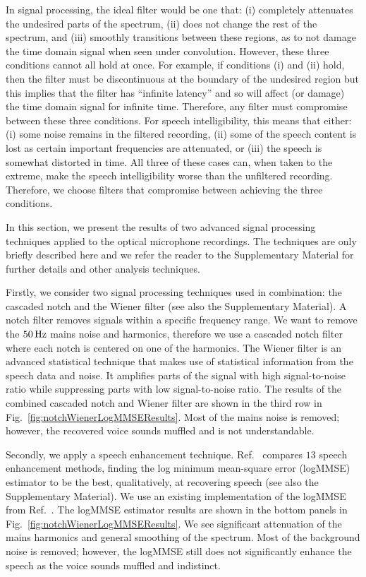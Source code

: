 \documentclass[paper-main.tex]{subfiles}
\begin{document}
In signal processing, the ideal filter would be one that:
(i) completely attenuates the undesired parts of the spectrum, 
(ii) does not change the rest of the spectrum, and 
(iii) smoothly transitions between these regions, as to not damage the time domain signal when seen under convolution. 
However, these three conditions cannot all hold at once. 
For example, if conditions (i) and (ii) hold, then the filter must be discontinuous at the boundary of the undesired region but this implies that the filter has ``infinite latency'' and so will affect (or damage) the time domain signal for infinite time.\cite{10.5555/151045}
Therefore, any filter must compromise between these three conditions. 
For speech intelligibility, this means that either: (i) some noise remains in the filtered recording, (ii) some of the speech content is lost as certain important frequencies are attenuated, or (iii) the speech is somewhat distorted in time.
All three of these cases can, when taken to the extreme, make the speech intelligibility worse than the unfiltered recording. 
Therefore, we choose filters that compromise between achieving the three conditions.


In this section, we present the results of two advanced signal processing techniques applied to the optical microphone recordings. 
The techniques are only briefly described here and we refer the reader to the Supplementary Material for further details and other analysis techniques. 



Firstly, we consider two signal processing techniques used in combination: the cascaded notch and the Wiener filter (see also the Supplementary Material). 
A notch filter removes signals within a specific frequency range. 
We want to remove the $50\,{\rm Hz}$ mains noise and harmonics, therefore we use a cascaded notch filter where each notch is centered on one of the harmonics. 
The Wiener filter is an advanced statistical technique that makes use of statistical information from the speech data and noise. 
It amplifies parts of the signal with high signal-to-noise ratio while suppressing parts with low signal-to-noise ratio. 
The results of the combined cascaded notch and Wiener filter are shown in the third row in Fig.~\ref{fig:notchWienerLogMMSEResults}. 
Most of the mains noise is removed; however, the recovered voice sounds muffled and is not understandable. 


Secondly, we apply a speech enhancement technique. 
Ref.~\cite{SubjectiveComparison} compares $13$ speech enhancement methods, finding the log minimum mean-square error (logMMSE) estimator to be the best, qualitatively, at recovering speech (see also the Supplementary Material). 
We use an existing implementation of the logMMSE from Ref.~\cite{logmmse}.  
The logMMSE estimator results are shown in the bottom panels in Fig.~\ref{fig:notchWienerLogMMSEResults}. 
We see significant attenuation of the mains harmonics and general smoothing of the spectrum. 
Most of the background noise is removed; however, the logMMSE still does not significantly enhance the speech as the voice sounds muffled and indistinct.
\end{document}
